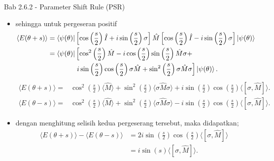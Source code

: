\begin{frame}{Bab 2.6.2 - Parameter Shift Rule (PSR)}
    \begin{itemize}
        \item sehingga untuk pergeseran positif
        {\tiny
        \begin{equation}
            \begin{split}
                \langle E(\theta+s)\rangle = \bra{\psi(\theta)} & \left[ \cos\left(\frac{s}{2}\right) \hat{I} + i \sin\left(\frac{s}{2}\right) \sigma \right] \hat{M} \left[ \cos\left(\frac{s}{2}\right) \hat{I} - i \sin\left(\frac{s}{2}\right) \sigma \right] \ket{\psi(\theta)} \\
                = \bra{\psi(\theta)} & \left[ \cos^2\left(\frac{s}{2}\right) \hat{M} - i \cos\left(\frac{s}{2}\right) \sin\left(\frac{s}{2}\right) \hat{M} \sigma + \right. \\
                & \left. i \sin\left(\frac{s}{2}\right) \cos\left(\frac{s}{2}\right) \sigma \hat{M} + \sin^2\left(\frac{s}{2}\right) \sigma \hat{M} \sigma \right] \ket{\psi(\theta)}.
            \end{split}
        \end{equation}
        \begin{equation}
            \begin{split}
            \langle E(\theta+s)\rangle = &\cos^2\left(\frac{s}{2}\right) \langle \hat{M} \rangle + \sin^2\left(\frac{s}{2}\right) \langle\sigma \hat{M} \sigma\rangle + i \sin\left(\frac{s}{2}\right) \cos\left(\frac{s}{2}\right) \langle [\sigma, \hat{M}] \rangle.
            \end{split}
        \end{equation}
        \begin{equation}
            \begin{split}
            \langle E(\theta-s)\rangle = &\cos^2\left(\frac{s}{2}\right) \langle \hat{M} \rangle + \sin^2\left(\frac{s}{2}\right) \langle\sigma \hat{M} \sigma\rangle - i \sin\left(\frac{s}{2}\right) \cos\left(\frac{s}{2}\right) \langle [\sigma, \hat{M}] \rangle.
            \end{split}
        \end{equation}
        }
        \item dengan menghitung selisih kedua pergeserang tersebut, maka didapatkan;
        \begin{equation}
            \begin{split}
                \langle E(\theta+s)\rangle - \langle E(\theta-s)\rangle &= 2 i \sin\left(\frac{s}{2}\right) \cos\left(\frac{s}{2}\right) \langle [\sigma, \hat{M}] \rangle \\
                &= i \sin(s) \langle [\sigma, \hat{M}] \rangle.
            \end{split}
        \end{equation}
    \end{itemize}
\end{frame}

